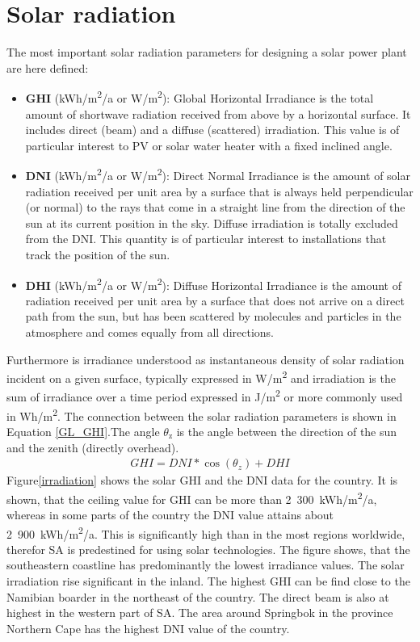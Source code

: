 \documentclass[Master,MEE,english]{twbook}%
\begin{document}
\section{Solar radiation}
The most important solar radiation parameters for designing a solar power plant are here defined:
\begin{itemize}
\item \textbf{GHI} (kWh/m\textsuperscript{2}/a or W/m\textsuperscript{2}): Global Horizontal Irradiance is the total amount of shortwave radiation received from above by a horizontal surface. It includes direct (beam) and a diffuse (scattered) irradiation. This value is of particular interest to PV or solar water heater with a fixed inclined angle.
\item \textbf{DNI} (kWh/m\textsuperscript{2}/a or W/m\textsuperscript{2}): Direct Normal Irradiance is the amount of solar radiation received per unit area by a surface that is always held perpendicular (or normal) to the rays that come in a straight line from the direction of the sun at its current position in the sky. Diffuse irradiation is totally excluded from the DNI. This quantity is of particular interest to  installations that track the position of the sun.
\item \textbf{DHI} (kWh/m\textsuperscript{2}/a or W/m\textsuperscript{2}): Diffuse Horizontal Irradiance is the amount of radiation received per unit area by a surface that does not arrive on a direct path from the sun, but has been scattered by molecules and particles in the atmosphere and comes equally from all directions.
\end{itemize}
Furthermore is irradiance understood as instantaneous density of solar radiation incident on a given surface, typically expressed in W/m\textsuperscript{2} and irradiation is the sum of irradiance over a time period expressed in J/m\textsuperscript{2} or more commonly used in Wh/m\textsuperscript{2}. The connection between the solar radiation parameters is shown in Equation \ref{GL_GHI}.The angle $\theta_\text{z}$ is the angle between the direction of the sun and the zenith (directly overhead).
\begin{align}
GHI=DNI*\cos(\theta_{z})+DHI \label{GL_GHI}
\end{align}
Figure\ref{irradiation} shows the solar GHI and the DNI data for the country. It is shown, that the ceiling value for GHI can be more than 2~300~kWh/m\textsuperscript{2}/a, whereas in some parts of the country the DNI  value attains about 2~900~kWh/m\textsuperscript{2}/a. This is significantly high than in the most regions worldwide, therefor SA is predestined for using solar technologies. The figure shows, that the southeastern coastline has predominantly the lowest irradiance values. The solar irradiation rise significant in the inland. The highest GHI can be find close to the Namibian boarder in the northeast of the country. The direct beam is also at highest in the western part of SA. The area around Springbok in the province Northern Cape has the highest DNI value of the country.
\end{document}
